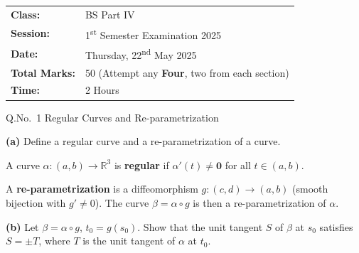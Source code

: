 \documentclass[12pt]{article}
\begin{document}
\vspace{16pt}

\begin{tcolorbox}[colback=lightbg, colframe=accent, arc=4pt, boxrule=1pt,
  left=12pt, right=12pt, top=10pt, bottom=10pt]
\begin{tabular}{ll}
  \textcolor{accent}{\bfseries Class:} & BS Part IV \\
  \textcolor{accent}{\bfseries Session:} & 1\textsuperscript{st} Semester Examination 2025 \\
  \textcolor{accent}{\bfseries Date:} & Thursday, 22\textsuperscript{nd} May 2025 \\
  \textcolor{accent}{\bfseries Total Marks:} & 50 \quad(Attempt any \textbf{Four}, two from each section)\\
  \textcolor{accent}{\bfseries Time:} & 2 Hours \\
\end{tabular}
\end{tcolorbox}

\newpage

\begin{tcolorbox}[colback=primary, colframe=primary, arc=0pt, boxrule=0pt,
  left=16pt, right=16pt, top=12pt, bottom=12pt,
  borderline south={4pt}{0pt}{accent}]
\end{tcolorbox}

\vspace{12pt}

\begin{qbox}{Q.No.\ 1}
Regular Curves and Re-parametrization
\end{qbox}

\vspace{6pt}
\textbf{(a)} Define a regular curve and a re-parametrization of a curve.

\begin{ansbox}
A curve $\alpha:(a,b)\to\mathbb{R}^3$ is \textbf{regular} if $\alpha'(t)\neq\mathbf{0}$ for all $t\in(a,b)$.

A \textbf{re-parametrization} is a diffeomorphism $g:(c,d)\to(a,b)$ (smooth bijection with $g'\neq0$). The curve $\beta=\alpha\circ g$ is then a re-parametrization of $\alpha$.
\end{ansbox}

\vspace{10pt}
\textbf{(b)} Let $\beta=\alpha\circ g$, $t_0=g(s_0)$. Show that the unit tangent $S$ of $\beta$ at $s_0$ satisfies $S=\pm T$, where $T$ is the unit tangent of $\alpha$ at $t_0$.
\end{document}
